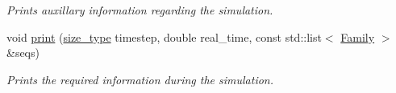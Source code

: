 \begin{DoxyCompactItemize}
\begin{DoxyCompactList}\small\item\em Prints auxillary information regarding the simulation. \end{DoxyCompactList}\item 
\mbox{\label{classrcombinator_1_1Output_a9b28f297886b9e8f1e764b688c9a9da7}} 
void \mbox{\hyperlink{classrcombinator_1_1Output_a9b28f297886b9e8f1e764b688c9a9da7}{print}} (\mbox{\hyperlink{constants_8h_abcd18a5521fc90ff6e7b00e4fee98397}{size\+\_\+type}} timestep, double real\+\_\+time, const std\+::list$<$ \mbox{\hyperlink{classrcombinator_1_1Family}{Family}} $>$ \&seqs)
\begin{DoxyCompactList}\small\item\em Prints the required information during the simulation. \end{DoxyCompactList}\end{DoxyCompactItemize}
